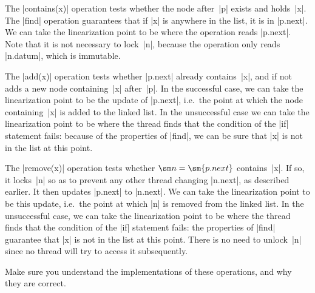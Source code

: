 The |contains(x)| operation tests whether the node after~|p| exists
and holds~|x|.  The |find| operation guarantees that if |x| is anywhere in the
list, it is in |p.next|.  We can take the linearization point to be where the
operation reads |p.next|.  Note that it is not necessary to lock~|n|, because
the operation only reads |n.datum|, which is immutable. 

The |add(x)| operation tests whether |p.next| already contains~|x|, and if not
adds a new node containing~|x| after~|p|.  In the successful case, we can take
the linearization point to be the update of |p.next|, i.e.~the point at which
the node containing~|x| is added to the linked list.  In the unsuccessful case
we can take the linearization point to be where the thread finds that the
condition of the |if| statement fails: because of the properties of |find|, we
can be sure that |x| is not in the list at this point.  

The |remove(x)| operation tests whether $\sm n = \sm{p.next}$ contains~|x|.
If so, it locks~|n| so as to prevent any other thread changing |n.next|, as
described earlier.  It then updates |p.next| to |n.next|.  We can take the
linearization point to be this update, i.e.~the point at which |n| is removed
from the linked list.  In the unsuccessful case, we can take the linearization
point to be where the thread finds that the condition of the |if| statement
fails: the properties of |find| guarantee that |x| is not in the list at this
point.  There is no need to unlock~|n| since no thread will try to access it
subsequently. 

\begin{instruction}
Make sure you understand the implementations of these operations, and why they
are correct.
\end{instruction}

